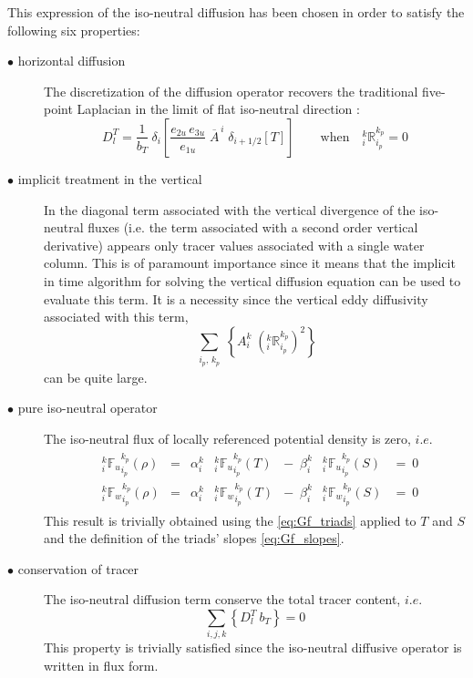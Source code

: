\documentclass[../tex_main/NEMO_manual]{subfiles}
\begin{document}
This expression of the iso-neutral diffusion has been chosen in order to satisfy 
the following six properties:
\begin{description}
\item[$\bullet$ horizontal diffusion] The discretization of the diffusion operator 
recovers the traditional five-point Laplacian in the limit of flat iso-neutral direction :
\begin{equation} \label{eq:Gf_property1a}
D_l^T = \frac{1}{b_T}  \ \delta_{i} 
	\left[ \frac{e_{2u}\,e_{3u}}{e_{1u}} \; \overline{A}^{\,i} \; \delta_{i+1/2}[T] \right] 
\qquad  \text{when} \quad 
	{ _i^k \mathbb{R}_{i_p}^{k_p} }=0
\end{equation}

\item[$\bullet$ implicit treatment in the vertical]  In the diagonal term associated 
with the vertical divergence of the iso-neutral fluxes (i.e. the term associated 
with a second order vertical derivative) appears only tracer values associated 
with a single water column. This is of paramount importance since it means
that the implicit in time algorithm for solving the vertical diffusion equation can 
be used to evaluate this term. It is a necessity since the vertical eddy diffusivity 
associated with this term,  
\begin{equation}
	 \sum_{\substack{i_p, \,k_p}} \left\{  
		A_i^k \; \left(_i^k \mathbb{R}_{i_p}^{k_p}\right)^2
	\right\} 
\end{equation}
can be quite large.

\item[$\bullet$ pure iso-neutral operator]  The iso-neutral flux of locally referenced 
potential density is zero, $i.e.$
\begin{align} \label{eq:Gf_property2}
\begin{matrix}
&{_i^k {\mathbb{F}_u}_{i_p}^{k_p} (\rho)} 
	&=    &\alpha_i^k   &{_i^k {\mathbb{F}_u}_{i_p}^{k_p} } (T) 
	&- \ \;  \beta _i^k    &{_i^k {\mathbb{F}_u}_{i_p}^{k_p} } (S) & = \ 0   \\
&{_i^k {\mathbb{F}_w}_{i_p}^{k_p} (\rho)} 
	&=    &\alpha_i^k   &{_i^k {\mathbb{F}_w}_{i_p}^{k_p} } (T) 
	&- \  \; \beta _i^k    &{_i^k {\mathbb{F}_w}_{i_p}^{k_p} } (S)  &= \ 0
\end{matrix}
\end{align}
This result is trivially obtained using the \autoref{eq:Gf_triads} applied to $T$ and $S$ 
and the definition of the triads' slopes \autoref{eq:Gf_slopes}.

\item[$\bullet$ conservation of tracer] The iso-neutral diffusion term conserve the 
total tracer content, $i.e.$
\begin{equation} \label{eq:Gf_property1}
\sum_{i,j,k} \left\{ D_l^T \ b_T \right\} = 0
\end{equation}
This property is trivially satisfied since the iso-neutral diffusive operator 
is written in flux form.


\end{description}
\end{document}
